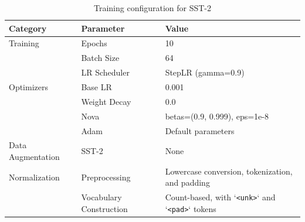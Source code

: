\documentclass{article}
\begin{document}
\begin{table}[H]
\centering
\caption{Training configuration for SST-2}
\label{tab:sst2_train_config}
\begin{tabular}{l|l|l}
\hline
\textbf{Category} & \textbf{Parameter} & \textbf{Value} \\
\hline
Training & Epochs & 10 \\
         & Batch Size & 64 \\
         & LR Scheduler & StepLR (gamma=0.9) \\
\hline
Optimizers & Base LR & 0.001 \\
           & Weight Decay & 0.0 \\
           & Nova & betas=(0.9, 0.999), eps=1e-8 \\
           & Adam & Default parameters \\
\hline
Data Augmentation & SST-2 & None \\
\hline
Normalization & Preprocessing & Lowercase conversion, tokenization, and padding \\
              & Vocabulary Construction & Count-based, with `\texttt{<unk>}` and `\texttt{<pad>}` tokens \\
\hline
\end{tabular}
\end{table}
\end{document}
